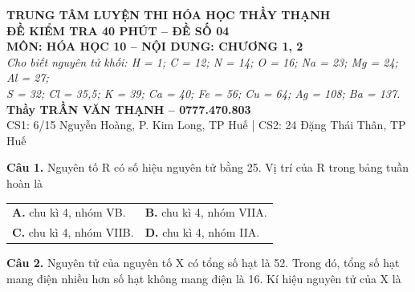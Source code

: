 \documentclass{article}
\begin{document}

\begin{center}
\vspace*{0.6cm}
{\fontsize{24}{30}\selectfont \textbf{TRUNG TÂM LUYỆN THI HÓA HỌC THẦY THẠNH}}\\[0.6cm]
{\fontsize{34}{42}\selectfont \textbf{\color{brandGreen}ĐỀ KIỂM TRA 40 PHÚT -- ĐỀ SỐ 04}}\\[0.4cm]
{\fontsize{28}{36}\selectfont \textbf{MÔN: HÓA HỌC 10 -- NỘI DUNG: CHƯƠNG 1, 2}}\\[0.8cm]
{\fontsize{22}{30}\selectfont \textit{Cho biết nguyên tử khối: H = 1; C = 12; N = 14; O = 16; Na = 23; Mg = 24; Al = 27;}}\\[0.2cm]
{\fontsize{22}{30}\selectfont \textit{S = 32; Cl = 35,5; K = 39; Ca = 40; Fe = 56; Cu = 64; Ag = 108; Ba = 137.}}\\[1.0cm]
{\fontsize{24}{30}\selectfont \textbf{\color{brandRed}Thầy TRẦN VĂN THẠNH -- 0777.470.803}}\\[0.3cm]
{\fontsize{20}{26}\selectfont CS1: 6/15 Nguyễn Hoàng, P. Kim Long, TP Huế \quad | \quad CS2: 24 Đặng Thái Thân, TP Huế}
\end{center}
\newpage


\fontsize{30}{39}\selectfont
\textbf{Câu 1.} Nguyên tố R có số hiệu nguyên tử bằng 25. Vị trí của R trong bảng tuần hoàn là
\vspace{8pt}

\begin{tabularx}{\linewidth}{@{}X X@{}}
\textbf{A.} chu kì 4, nhóm VB. & \textbf{B.} chu kì 4, nhóm VIIA.\\[8pt]
\textbf{C.} chu kì 4, nhóm VIIB. & \textbf{D.} chu kì 4, nhóm IIA.
\end{tabularx}

\vspace*{\fill}

\textbf{Câu 2.} Nguyên tử của nguyên tố X có tổng số hạt là 52. Trong đó, tổng số hạt mang điện nhiều hơn số hạt không mang điện là 16. Kí hiệu nguyên tử của X là
\vspace{8pt}
\end{document}
